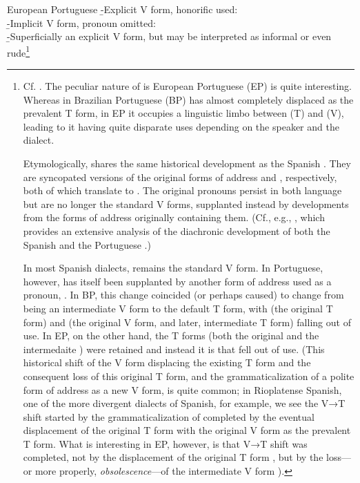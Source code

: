\pex
	\a European Portuguese
		\beginsubsub
			\b{-}{Explicit V form, honorific used:\\
				 }
			\b{-}{Implicit V form, pronoun omitted:\\
				 }
			\b{-}{Superficially an explicit V form, but may be interpreted as informal or even rude\footnote{
				Cf. \textcite{laraport}. The peculiar nature of  is European Portuguese (EP) is quite interesting. Whereas in Brazilian Portuguese (BP)  has almost completely displaced  as the prevalent T form, in EP it occupies a linguistic limbo between  (T) and  (V), leading to it having quite disparate uses depending on the speaker and the dialect.

				Etymologically,  shares the same historical
				development as the Spanish . They
				are syncopated versions of the original forms of address
				 and ,
				respectively, both of which translate to . The original pronouns 
				persist in both language but are no longer the standard V forms,
				supplanted instead by developments from the forms of address
				originally containing them. (Cf., e.g., \cite{hummelport}, which
				provides an extensive analysis of the diachronic development of
				both the Spanish  and the Portuguese
				.)
	
				In most Spanish dialects,  remains
				the standard V form. In Portuguese, however,
				 has itself been supplanted by another form of
				address used as a pronoun, . In BP,
				this change coincided (or perhaps caused)  to change
				from being an intermediate V form to the default T form, with
				 (the original T form) and  (the
				original V form, and later, intermediate T form) falling out of
				use. In EP, on the other hand, the T forms
				(both the original  and the intermedaite
				) were retained and instead it is 
				that fell out of use. (This historical shift of the V form
				displacing the existing T form and the consequent loss of this
				original T form, and the grammaticalization of a polite form of
				address as a new V form, is quite common; in Rioplatense
				Spanish, one of the more divergent dialects of
				Spanish, for example, we see the V→T shift
				started by the grammaticalization of  completed
				by the eventual displacement of the original T form
				 with the original V form  as the
				prevalent T form. What is interesting in EP, however, is that
				V→T shift was completed, not by the displacement of the original
				T form , but by the loss---or more properly,
				\emph{obsolescence}---of the intermediate V form
				).

}}
